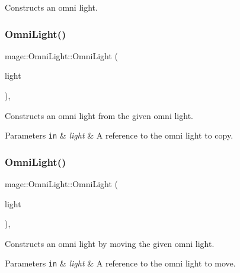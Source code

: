 Constructs an omni light. \hypertarget{classmage_1_1_omni_light_ac52de90bfbdc72d50b1f258f734b5fc9}{}\label{classmage_1_1_omni_light_ac52de90bfbdc72d50b1f258f734b5fc9} 
\subsubsection{\texorpdfstring{Omni\+Light()}{OmniLight()}\hspace{0.1cm}{\footnotesize\ttfamily [2/3]}}
{\footnotesize\ttfamily mage\+::\+Omni\+Light\+::\+Omni\+Light (\begin{DoxyParamCaption}\item[{const \hyperlink{classmage_1_1_omni_light}{Omni\+Light} \&}]{light }\end{DoxyParamCaption})\hspace{0.3cm}{\ttfamily [default]}, {\ttfamily [noexcept]}}

Constructs an omni light from the given omni light.


\begin{DoxyParams}[1]{Parameters}
\mbox{\tt in}  & {\em light} & A reference to the omni light to copy. \\
\hline
\end{DoxyParams}
\hypertarget{classmage_1_1_omni_light_a541a41f6173c94833def1f30fa90fd6f}{}\label{classmage_1_1_omni_light_a541a41f6173c94833def1f30fa90fd6f} 
\subsubsection{\texorpdfstring{Omni\+Light()}{OmniLight()}\hspace{0.1cm}{\footnotesize\ttfamily [3/3]}}
{\footnotesize\ttfamily mage\+::\+Omni\+Light\+::\+Omni\+Light (\begin{DoxyParamCaption}\item[{\hyperlink{classmage_1_1_omni_light}{Omni\+Light} \&\&}]{light }\end{DoxyParamCaption})\hspace{0.3cm}{\ttfamily [default]}, {\ttfamily [noexcept]}}

Constructs an omni light by moving the given omni light.


\begin{DoxyParams}[1]{Parameters}
\mbox{\tt in}  & {\em light} & A reference to the omni light to move. \\
\hline
\end{DoxyParams}
\hypertarget{classmage_1_1_omni_light_af6f4921499b430041966f38aac920b69}{}\label{classmage_1_1_omni_light_af6f4921499b430041966f38aac920b69} 
